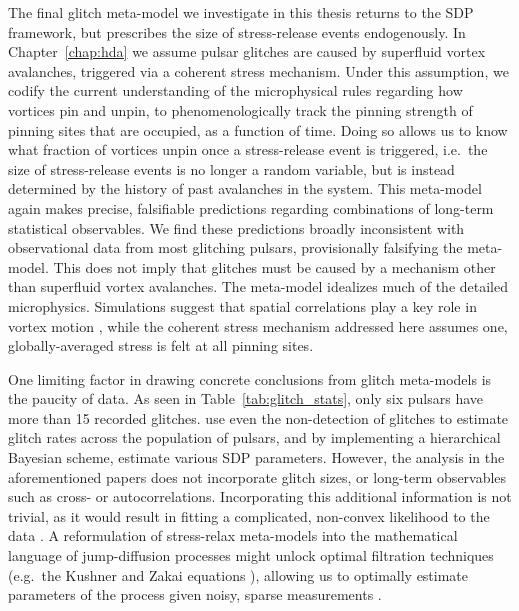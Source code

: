 The final glitch meta-model we investigate in this thesis returns to the SDP framework, but prescribes the size of stress-release events endogenously. In Chapter~\ref{chap:hda} we assume pulsar glitches are caused by superfluid vortex avalanches, triggered via a coherent stress mechanism. Under this assumption, we codify the current understanding of the microphysical rules regarding how vortices pin and unpin, to phenomenologically track the pinning strength of pinning sites that are occupied, as a function of time. Doing so allows us to know what fraction of vortices unpin once a stress-release event is triggered, i.e.~the size of stress-release events is no longer a random variable, but is instead determined by the history of past avalanches in the system. This meta-model again makes precise, falsifiable predictions regarding combinations of long-term statistical observables. We find these predictions broadly inconsistent with observational data from most glitching pulsars, provisionally falsifying the meta-model. This does not imply that glitches must be caused by a mechanism other than superfluid vortex avalanches. The meta-model idealizes much of the detailed microphysics. Simulations suggest that spatial correlations play a key role in vortex motion \citep{Howitt2020}, while the coherent stress mechanism addressed here assumes one, globally-averaged stress is felt at all pinning sites.

One limiting factor in drawing concrete conclusions from glitch meta-models is the paucity of data. As seen in Table~\ref{tab:glitch_stats}, only six pulsars have more than 15 recorded glitches. \citet{Millhouse2022, Melatos2023glitch} use even the non-detection of glitches to estimate glitch rates across the population of pulsars, and by implementing a hierarchical Bayesian scheme, estimate various SDP parameters. However, the analysis in the aforementioned papers does not incorporate glitch sizes, or long-term observables such as cross- or autocorrelations. Incorporating this additional information is not trivial, as it would result in fitting a complicated, non-convex likelihood to the data \citep{Melatos2019}. A reformulation of stress-relax meta-models into the mathematical language of jump-diffusion processes might unlock optimal filtration techniques (e.g.~the Kushner and Zakai equations \citep{Kushner1964,Zakai1969}), allowing us to optimally estimate parameters of the process given noisy, sparse measurements \citep{Schuss2012}.

